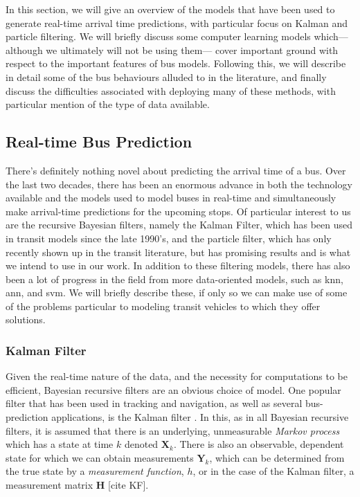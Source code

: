 \documentclass[12pt,a4paper]{article}
\newcommand{\bY}{\mathbf{Y}}
\newcommand{\bX}{\mathbf{X}}
\newcommand{\mat}[1]{\mathbf{#1}}
\newcommand{\kf}{Kalman filter}
\begin{document}
In this section, we will give an overview of the models that have been used
to generate real-time arrival time predictions,
with particular focus on Kalman and particle filtering.
We will briefly discuss some computer learning models which---%
although we ultimately will not be using them---%
cover important ground with respect to the important features of bus models.
Following this, we will describe in detail some of the
bus behaviours alluded to in the literature,
and finally discuss the difficulties associated with deploying many of these methods,
with particular mention of the type of data available.


\subsection{Real-time Bus Prediction}
\label{sec:history}

There's definitely nothing novel about predicting the arrival time of a bus.
Over the last two decades, 
there has been an enormous advance in both the technology available and the models used
to model buses in real-time and simultaneously make arrival-time predictions for the upcoming stops.
Of particular interest to us are the recursive Bayesian filters, 
namely the Kalman Filter, which has been used in transit models since the late 1990's,
and the particle filter, which has only recently shown up in the transit literature,
but has promising results and is what we intend to use in our work.
In addition to these filtering models, 
there has also been a lot of progress in the field from more data-oriented models,
such as \gls{knn}, \gls{ann}, and \gls{svm}.
We will briefly describe these, if only so we can make use of some of the problems
particular to modeling transit vehicles to which they offer solutions.



\subsubsection{Kalman Filter}
\label{sec:kalman-filter}

Given the real-time nature of the data, and the necessity for computations to be efficient,
Bayesian recursive filters are an obvious choice of model.
One popular filter that has been used in tracking and navigation,
as well as several bus-prediction applications,
is the \kf{} \citep{wall-dailey:1999,dailey:2001}.
In this, as in all Bayesian recursive filters,
it is assumed that there is an underlying, unmeasurable \emph{Markov process}
which has a state at time $k$ denoted $\bX_k$.
There is also an observable, dependent state for which we can obtain measurements $\bY_k$,
which can be determined from the true state by a \emph{measurement function}, $h$,
or in the case of the \kf{}, a measurement matrix $\mat{H}$
\citep{cn} [cite KF].
\end{document}
